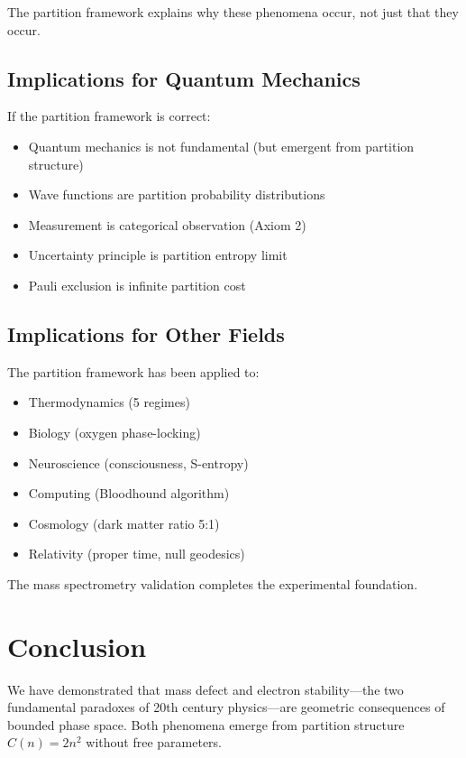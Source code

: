 \documentclass[12pt,a4paper]{article}
\begin{document}
The partition framework explains why these phenomena occur, not just that they occur.

\subsection{Implications for Quantum Mechanics}

If the partition framework is correct:

\begin{itemize}
\item Quantum mechanics is not fundamental (but emergent from partition structure)
\item Wave functions are partition probability distributions
\item Measurement is categorical observation (Axiom 2)
\item Uncertainty principle is partition entropy limit
\item Pauli exclusion is infinite partition cost
\end{itemize}

\subsection{Implications for Other Fields}

The partition framework has been applied to:

\begin{itemize}
\item Thermodynamics (5 regimes) \cite{YourPaper1}
\item Biology (oxygen phase-locking) \cite{YourPaper2}
\item Neuroscience (consciousness, S-entropy) \cite{YourPaper3}
\item Computing (Bloodhound algorithm) \cite{YourPaper4}
\item Cosmology (dark matter ratio 5:1) \cite{YourPaper5}
\item Relativity (proper time, null geodesics) \cite{YourPaper6}
\end{itemize}

The mass spectrometry validation completes the experimental foundation.

\section{Conclusion}

We have demonstrated that mass defect and electron stability—the two fundamental paradoxes of 20th century physics—are geometric consequences of bounded phase space. Both phenomena emerge from partition structure $C(n) = 2n^2$ without free parameters.
\end{document}
